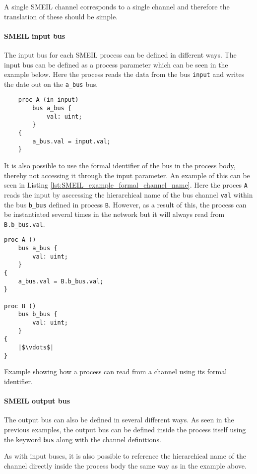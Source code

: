 A single SMEIL channel corresponds to a single \cspm{} channel and therefore the translation of these should be simple.
\paragraph{SMEIL input bus}
The input bus for each SMEIL process can be defined in different ways. The input bus can be defined as a process parameter which can be seen in the example below. Here the process reads the data from the bus \texttt{input} and writes the date out on the \texttt{a\_bus} bus.
\begin{verbatim}
    proc A (in input)
        bus a_bus {
            val: uint;
        }
    {
        a_bus.val = input.val;
    }
\end{verbatim}
It is also possible to use the formal identifier of the bus in the process body, thereby not accessing it through the input parameter. An example of this can be seen in Listing \ref{lst:SMEIL_example_formal_channel_name}. Here the proces \texttt{A} reads the input by asccessing the hierarchical name of the bus channel \texttt{val} within the bus \texttt{b\_bus} defined in process \texttt{B}. However, as a result of this, the process can be instantiated several times in the network but it will always read from \texttt{B.b\_bus.val}.
\begin{listing}
\begin{verbatim}
proc A ()
    bus a_bus {
        val: uint;
    }
{
    a_bus.val = B.b_bus.val;
}

proc B ()
    bus b_bus {
        val: uint;
    }
{
    |$\vdots$|
}
\end{verbatim}
\caption{Example showing how a process can read from a channel using its formal identifier.}
\label{lst:SMEIL_example_formal_channel_name}
\end{listing}


\paragraph{SMEIL output bus}
The output bus can also be defined in several different ways.
As seen in the previous examples, the output bus can be defined inside the process itself using the keyword \texttt{bus} along with the channel definitions.

As with input buses, it is also possible to reference the hierarchical name of the channel directly inside the process body the same way as in the example above.

